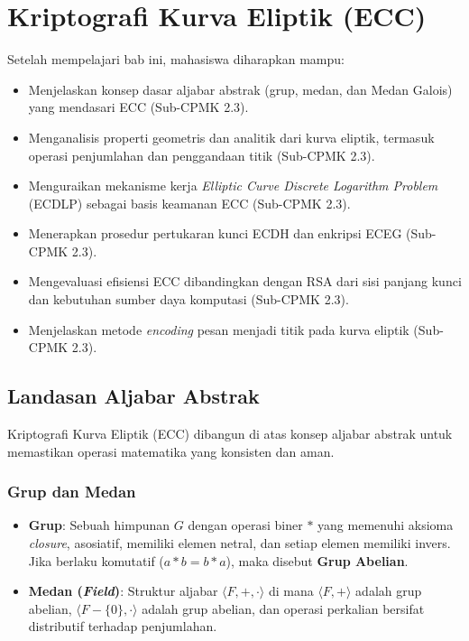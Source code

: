 \documentclass[../main.tex]{subfiles}
\begin{document}
\chapter{Kriptografi Kurva Eliptik (ECC)}

\begin{learningoutcome}
Setelah mempelajari bab ini, mahasiswa diharapkan mampu:
\begin{itemize}
    \item Menjelaskan konsep dasar aljabar abstrak (grup, medan, dan Medan Galois) yang mendasari ECC (Sub-CPMK 2.3).
    \item Menganalisis properti geometris dan analitik dari kurva eliptik, termasuk operasi penjumlahan dan penggandaan titik (Sub-CPMK 2.3).
    \item Menguraikan mekanisme kerja \textit{Elliptic Curve Discrete Logarithm Problem} (ECDLP) sebagai basis keamanan ECC (Sub-CPMK 2.3).
    \item Menerapkan prosedur pertukaran kunci ECDH dan enkripsi ECEG (Sub-CPMK 2.3).
    \item Mengevaluasi efisiensi ECC dibandingkan dengan RSA dari sisi panjang kunci dan kebutuhan sumber daya komputasi (Sub-CPMK 2.3).
    \item Menjelaskan metode \textit{encoding} pesan menjadi titik pada kurva eliptik (Sub-CPMK 2.3).
\end{itemize}
\end{learningoutcome}

\section{Landasan Aljabar Abstrak}
Kriptografi Kurva Eliptik (ECC) dibangun di atas konsep aljabar abstrak untuk memastikan operasi matematika yang konsisten dan aman.

\subsection{Grup dan Medan}
\begin{itemize}
    \item \textbf{Grup}: Sebuah himpunan $G$ dengan operasi biner $*$ yang memenuhi aksioma \textit{closure}, asosiatif, memiliki elemen netral, dan setiap elemen memiliki invers. Jika berlaku komutatif ($a*b = b*a$), maka disebut \textbf{Grup Abelian}.
    \item \textbf{Medan (\textit{Field})}: Struktur aljabar $\langle F, +, \cdot \rangle$ di mana $\langle F, + \rangle$ adalah grup abelian, $\langle F - \{0\}, \cdot \rangle$ adalah grup abelian, dan operasi perkalian bersifat distributif terhadap penjumlahan.
\end{itemize}
\end{document}
